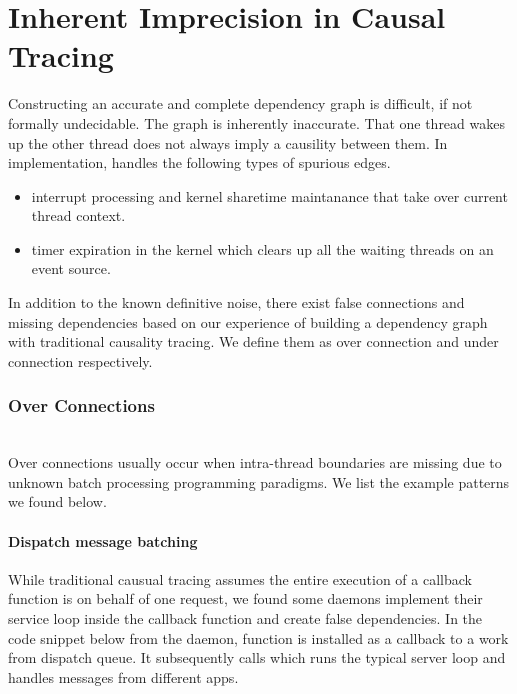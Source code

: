 \section{Inherent Imprecision in Causal Tracing}\label{sec:inherentinaccuracy}

Constructing an accurate and complete dependency graph is difficult, if not
formally undecidable. The graph is inherently inaccurate. That one thread
wakes up the other thread does not always imply a causility between them. In
implementation, \xxx handles the following types of spurious edges.

\begin{itemize}

\item interrupt processing and kernel sharetime maintanance that take over
current thread context.

\item timer expiration in the kernel which clears up all the waiting threads on
an event source.

\end{itemize}

\noindent In addition to the known definitive noise, there exist false connections and
missing dependencies based on our experience of building a dependency graph
with traditional causality tracing. We define them as over connection and under
connection respectively.

\vspace{1.5mm}
\subsubsection{Over Connections}\hfill\\
\vspace{-0.5mm}
Over connections usually occur when intra-thread boundaries are missing due to
unknown batch processing programming paradigms. We list the example patterns we
found below.

\paragraph{Dispatch message batching}

While traditional causual tracing assumes the entire execution of a callback
function is on behalf of one request, we found some daemons implement their
service loop inside the callback function and create false dependencies. In the
code snippet below from the  daemon, function 
is installed as a callback to a work from dispatch queue. It subsequently calls
 which runs the typical server loop and handles
messages from different apps.

